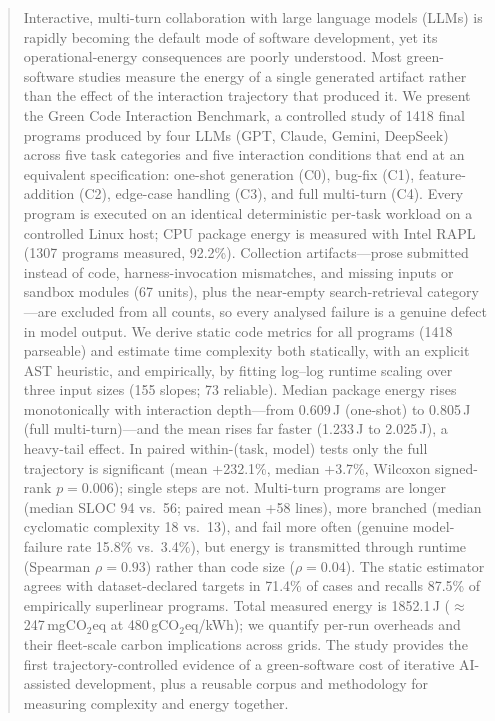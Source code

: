 \documentclass[journal]{IEEEtran}
\begin{document}
\maketitle

\begin{abstract}
Interactive, multi-turn collaboration with large language models (LLMs) is
rapidly becoming the default mode of software development, yet its
operational-energy consequences are poorly understood. Most green-software
studies measure the energy of a single generated artifact rather than the
effect of the interaction trajectory that produced it. We present the Green
Code Interaction Benchmark, a controlled study of 1418 final programs
produced by four LLMs (GPT, Claude, Gemini, DeepSeek) across five task
categories and five interaction conditions that end at an equivalent
specification: one-shot generation (C0), bug-fix (C1), feature-addition (C2),
edge-case handling (C3), and full multi-turn (C4). Every program is executed
on an identical deterministic per-task workload on a controlled Linux host;
CPU package energy is measured with Intel RAPL (1307 programs measured,
92.2\%). Collection artifacts---prose submitted instead of code,
harness-invocation mismatches, and missing inputs or sandbox modules (67
units), plus the near-empty search-retrieval category---are excluded from all
counts, so every analysed failure is a genuine defect in model output.
We derive static code metrics for all programs (1418 parseable)
and estimate time complexity both statically, with an explicit AST
heuristic, and empirically, by fitting log--log runtime scaling over three
input sizes (155 slopes; 73 reliable). Median package energy rises
monotonically with interaction depth---from 0.609\,J (one-shot) to 0.805\,J
(full multi-turn)---and the mean rises far faster (1.233\,J to 2.025\,J), a
heavy-tail effect. In paired within-(task, model) tests only the full
trajectory is significant (mean +232.1\%, median +3.7\%, Wilcoxon
signed-rank $p{=}0.006$); single steps are not. Multi-turn programs are
longer (median SLOC 94 vs.\ 56; paired mean +58 lines), more branched
(median cyclomatic complexity 18 vs.\ 13), and fail more often (genuine
model-failure rate 15.8\% vs.\ 3.4\%), but energy is transmitted through runtime
(Spearman $\rho{=}0.93$) rather than code size ($\rho{=}0.04$). The static
estimator agrees with dataset-declared targets in 71.4\% of cases and
recalls 87.5\% of empirically superlinear programs. Total measured energy is
1852.1\,J ($\approx$247\,mgCO$_{2}$eq at 480\,gCO$_{2}$eq/kWh); we quantify
per-run overheads and their fleet-scale carbon implications across grids.
The study provides the first trajectory-controlled evidence of a
green-software cost of iterative AI-assisted development, plus a reusable
corpus and methodology for measuring complexity and energy together.
\end{abstract}
\end{document}
